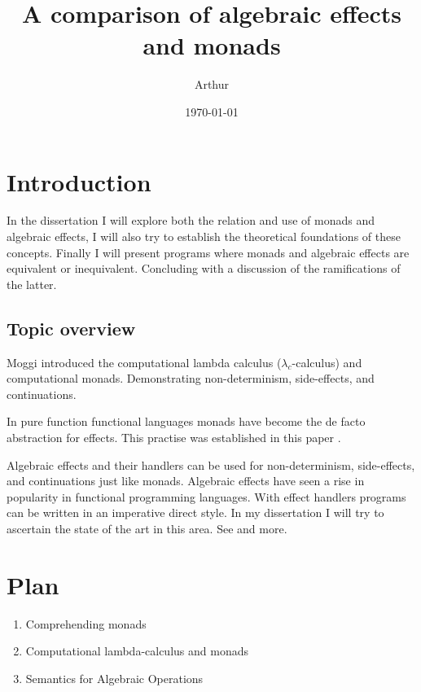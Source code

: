 \documentclass[a4paper,10pt]{article}
\title{A comparison of algebraic effects and monads}
\author{Arthur}
\date{\today}
\begin{document}
\maketitle
\section{Introduction}

In the dissertation I will explore both the relation and use of monads and algebraic effects,
I will also try to establish the theoretical foundations of these concepts.
Finally I will present programs where monads and algebraic effects are equivalent or
inequivalent. Concluding with a discussion of the ramifications of the latter.

\subsection{Topic overview}
Moggi \cite{Moggi:hc} introduced the computational lambda calculus (${\lambda}_c$-calculus)
and computational monads. Demonstrating non-determinism, side-effects, and continuations.

In pure function functional languages monads have become the de facto abstraction for effects.
This practise was established in this paper \cite{wadler1990}.

Algebraic effects \cite{plotkin2001adequacy} and their handlers \cite{Plotkin:2001jr}
can be used for non-determinism, side-effects, and continuations just like monads.
Algebraic effects have seen a rise in popularity in functional programming languages.
With effect handlers programs can be written in an imperative direct style.
In my dissertation I will try to ascertain the state of the art in this area.
See \cite{Bauer:2013fn, leijen:16, Lindley:2016vz, Dolan:2017} and more.



\section{Plan}

\begin{enumerate}
  \item Comprehending monads                     \cite{wadler1990}
  \item Computational lambda-calculus and monads \cite{Moggi:hc}
  \item Semantics for Algebraic Operations       \cite{Plotkin:2001jr}
\end{enumerate}
\end{document}
